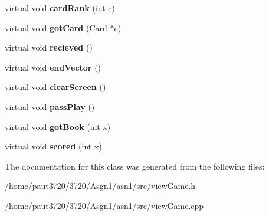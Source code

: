 \begin{DoxyCompactItemize}
\item 
\hypertarget{class_view_game_a0466f345ac0362e15ba30c62b829fd6d}{virtual void {\bfseries card\-Rank} (int c)}\label{class_view_game_a0466f345ac0362e15ba30c62b829fd6d}

\item 
\hypertarget{class_view_game_a68cd69cada66205eee85d63b5a6cc779}{virtual void {\bfseries got\-Card} (\hyperlink{class_card}{Card} $\ast$c)}\label{class_view_game_a68cd69cada66205eee85d63b5a6cc779}

\item 
\hypertarget{class_view_game_a9d8af96e58068147b4f709e8ce68ee8f}{virtual void {\bfseries recieved} ()}\label{class_view_game_a9d8af96e58068147b4f709e8ce68ee8f}

\item 
\hypertarget{class_view_game_ab479730cbc74f6319dd7693a2915d87e}{virtual void {\bfseries end\-Vector} ()}\label{class_view_game_ab479730cbc74f6319dd7693a2915d87e}

\item 
\hypertarget{class_view_game_af3a4ffaefaa2d709f28a30d97276eb3c}{virtual void {\bfseries clear\-Screen} ()}\label{class_view_game_af3a4ffaefaa2d709f28a30d97276eb3c}

\item 
\hypertarget{class_view_game_aa76990f66ec918c08be6e13882f1f81b}{virtual void {\bfseries pass\-Play} ()}\label{class_view_game_aa76990f66ec918c08be6e13882f1f81b}

\item 
\hypertarget{class_view_game_a042cc7151ec3ca3411b192484e8933ba}{virtual void {\bfseries got\-Book} (int x)}\label{class_view_game_a042cc7151ec3ca3411b192484e8933ba}

\item 
\hypertarget{class_view_game_a415fcea8ffb3e4144132ec44fb1c4eb9}{virtual void {\bfseries scored} (int x)}\label{class_view_game_a415fcea8ffb3e4144132ec44fb1c4eb9}

\end{DoxyCompactItemize}


The documentation for this class was generated from the following files\-:\begin{DoxyCompactItemize}
\item 
/home/paut3720/3720/\-Asgn1/asn1/src/view\-Game.\-h\item 
/home/paut3720/3720/\-Asgn1/asn1/src/view\-Game.\-cpp\end{DoxyCompactItemize}

